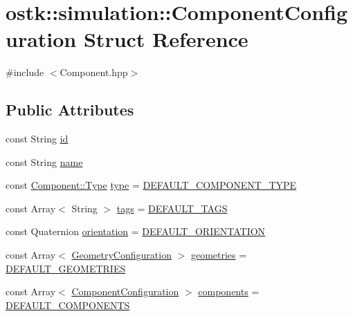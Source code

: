 \hypertarget{structostk_1_1simulation_1_1_component_configuration}{}\section{ostk\+:\+:simulation\+:\+:Component\+Configuration Struct Reference}
\label{structostk_1_1simulation_1_1_component_configuration}


{\ttfamily \#include $<$Component.\+hpp$>$}

\subsection*{Public Attributes}
\begin{DoxyCompactItemize}
\item 
const String \hyperlink{structostk_1_1simulation_1_1_component_configuration_a7ef5e182de95028f8f50a45d2f36790a}{id}
\item 
const String \hyperlink{structostk_1_1simulation_1_1_component_configuration_ab78915c05378490b92166223f335b412}{name}
\item 
const \hyperlink{classostk_1_1simulation_1_1_component_a1d2ded63a8ab0bd81e27f25921be1e20}{Component\+::\+Type} \hyperlink{structostk_1_1simulation_1_1_component_configuration_abd0e836f95e58db5c8e954469101a2c8}{type} = \hyperlink{_component_8hpp_a0e5d3d0d9b45cdf8c94ed8df0d00c3e3}{D\+E\+F\+A\+U\+L\+T\+\_\+\+C\+O\+M\+P\+O\+N\+E\+N\+T\+\_\+\+T\+Y\+PE}
\item 
const Array$<$ String $>$ \hyperlink{structostk_1_1simulation_1_1_component_configuration_a95b38d1660657a8d2ba6baf0f885bf13}{tags} = \hyperlink{_satellite_8hpp_a7cabb8538f234177d4f95e681045bf94}{D\+E\+F\+A\+U\+L\+T\+\_\+\+T\+A\+GS}
\item 
const Quaternion \hyperlink{structostk_1_1simulation_1_1_component_configuration_a85c06b983a2aeddc726310ac64a280b6}{orientation} = \hyperlink{_component_8hpp_a5c684aeaeb24d197904b5a34839d2dd9}{D\+E\+F\+A\+U\+L\+T\+\_\+\+O\+R\+I\+E\+N\+T\+A\+T\+I\+ON}
\item 
const Array$<$ \hyperlink{structostk_1_1simulation_1_1component_1_1_geometry_configuration}{Geometry\+Configuration} $>$ \hyperlink{structostk_1_1simulation_1_1_component_configuration_a0b82a80f2def5a34efbb72697c6bc24e}{geometries} = \hyperlink{_satellite_8hpp_a4a68d11996a67b508045cdc894fac4ba}{D\+E\+F\+A\+U\+L\+T\+\_\+\+G\+E\+O\+M\+E\+T\+R\+I\+ES}
\item 
const Array$<$ \hyperlink{structostk_1_1simulation_1_1_component_configuration}{Component\+Configuration} $>$ \hyperlink{structostk_1_1simulation_1_1_component_configuration_aa6be134c476783e16aab75dc4b9e7b3d}{components} = \hyperlink{_satellite_8hpp_a4efe76b184101f122bb1be222cb65afc}{D\+E\+F\+A\+U\+L\+T\+\_\+\+C\+O\+M\+P\+O\+N\+E\+N\+TS}
\end{DoxyCompactItemize}


